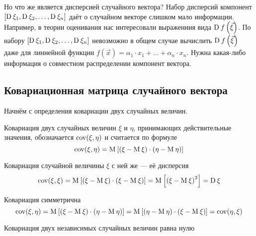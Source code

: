 Но что же является дисперсией случайного вектора?
Набор дисперсий компонент $\left[ \operatorname{D}_{} \xi_1, \operatorname{D}_{} \xi_2,
\dots, \operatorname{D}_{} \xi_n \right]$ даёт о случайном векторе слишком мало
информации.
Например, в теории оценивания нас интересовали выражениия вида
$\operatorname{D}_{} f\left( \vec{\xi} \right)$.
По набору $\left[ \operatorname{D}_{} \xi_1, \operatorname{D}_{} \xi_2, \dots,
\operatorname{D}_{} \xi_n \right]$ невозможно в общем случае вычислить
$\operatorname{D}_{} f\left( \vec{\xi} \right)$ даже для линнейной функции
$f\left( \vec{x} \right) = \alpha_1 \cdot x_1 + \dots + \alpha_n \cdot x_n$.
Нужна какая-либо информация о совместном распределении компонент вектора.

\subsection{Ковариационная матрица случайного вектора}

Начнём с определения ковариации двух случайных величин.

\begin{definition}[Ковариация]
  Ковариация двух случайных величин $\xi$ и $\eta$, принимающих действительные
  значения, обозначается $\operatorname{cov}\!\left( \xi, \eta \right)$ и считается по формуле
  \begin{equation}\label{eq:cov:def}
    \operatorname{cov}\!\left( \xi, \eta \right)
    = \operatorname{M}_{} \left[ \left( \xi - \operatorname{M}_{} \xi \right)
      \cdot \left( \eta - \operatorname{M}_{} \eta \right) \right]
  \end{equation}
\end{definition}

\begin{remark}
  Ковариация случайной величины $\xi$ с ней же --- её дисперсия
  $$\operatorname{cov}\!\left( \xi, \xi \right)
      = \operatorname{M}_{} \left[ \left( \xi - \operatorname{M}_{} \xi \right)
      \cdot \left( \xi - \operatorname{M}_{} \xi \right) \right]
      = \operatorname{M}_{} \left[ \left( \xi - \operatorname{M}_{} \xi \right)^2 \right]
      = \operatorname{D}_{} \xi$$
\end{remark}

\begin{remark}
  Ковариация симметрична
  $$\operatorname{cov}\!\left( \xi, \eta \right)
      = \operatorname{M}_{} \left[ \left( \xi - \operatorname{M}_{} \xi \right)
      \cdot \left( \eta - \operatorname{M}_{} \eta \right) \right]
      = \operatorname{M}_{} \left[ \left( \eta - \operatorname{M}_{} \eta \right)
      \cdot \left( \xi - \operatorname{M}_{} \xi \right) \right]
      = \operatorname{cov}\!\left( \eta, \xi \right)$$
\end{remark}

\begin{remark}\label{rem:covIndepentent}
  Ковариация двух независимых случайных величин равна нулю
  \cite[с.~244]{Feller1}
\end{remark}

